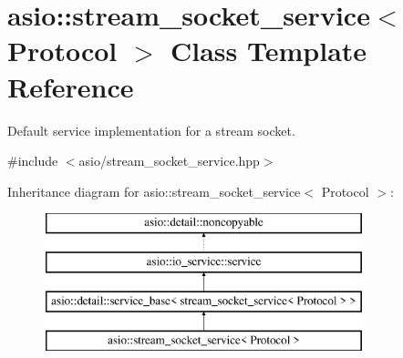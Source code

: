 \hypertarget{classasio_1_1stream__socket__service}{}\section{asio\+:\+:stream\+\_\+socket\+\_\+service$<$ Protocol $>$ Class Template Reference}
\label{classasio_1_1stream__socket__service}


Default service implementation for a stream socket.  




{\ttfamily \#include $<$asio/stream\+\_\+socket\+\_\+service.\+hpp$>$}

Inheritance diagram for asio\+:\+:stream\+\_\+socket\+\_\+service$<$ Protocol $>$\+:\begin{figure}[H]
\begin{center}
\leavevmode
\includegraphics[height=4.000000cm]{classasio_1_1stream__socket__service}
\end{center}
\end{figure}
